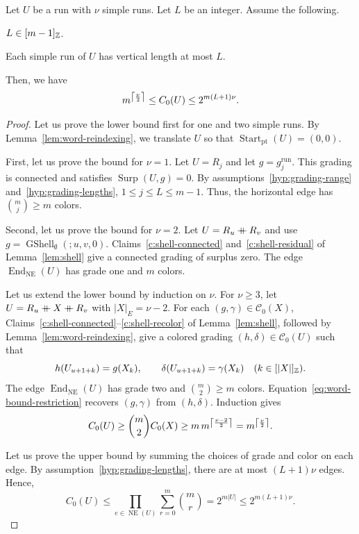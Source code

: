 \begin{lemma}\label{lem:word-bounds}
Let $U$ be a run with $\nu$ simple runs. Let $L$ be an integer.
Assume the following.
\begin{hypotheses}
\item\label{hyp:grading-range} $L\in[m-1]_{\mathbb Z}$.
\item\label{hyp:grading-lengths} Each simple run of $U$ has vertical length at most $L$.
\end{hypotheses}
Then, we have
\[
 m^{\left\lceil\frac{\nu}{2}\right\rceil}\le C_0(U)\le 2^{m(L+1)\nu}.
\]
\end{lemma}
\begin{proof}
Let us prove the lower bound first for one and two simple runs.
By Lemma~\ref{lem:word-reindexing}, we translate $U$ so that $\operatorname{Start}_{\mathrm{pt}}(U)=(0,0)$.

First, let us prove the bound for $\nu=1$.
Let $U=R_j$ and let $g=g_j^{\mathrm{run}}$.
This grading is connected and satisfies $\operatorname{Surp}(U,g)=0$.
By assumptions~\ref{hyp:grading-range} and~\ref{hyp:grading-lengths},
$1\le j\le L\le m-1$. Thus, the horizontal edge has $\binom mj\ge m$ colors.

Second, let us prove the bound for $\nu=2$.
Let $U=R_u\mathbin{+\mkern-10mu+} R_v$ and use
$g=\operatorname{GShell}_{\emptyset}(;u,v,0)$. Claims~\ref{c:shell-connected} and~\ref{c:shell-residual} of Lemma~\ref{lem:shell} give a connected grading of surplus zero.
The edge $\operatorname{End}_{\mathrm{NE}}(U)$ has grade one and $m$ colors.

Let us extend the lower bound by induction on $\nu$.
For $\nu\ge3$, let $U=R_u\mathbin{+\mkern-10mu+} X\mathbin{+\mkern-10mu+} R_v$ with $|X|_E=\nu-2$.
For each $(g,\gamma)\in\mathcal C_0(X)$, Claims~\ref{c:shell-connected}--\ref{c:shell-recolor} of Lemma~\ref{lem:shell}, followed by Lemma~\ref{lem:word-reindexing}, give a colored grading $(h,\delta)\in\mathcal C_0(U)$ such that
\begin{equation}\label{eq:word-bound-restriction}
 h(U_{u+1+k})=g(X_k),\qquad
 \delta(U_{u+1+k})=\gamma(X_k)\quad(k\in[|X|]_{\mathbb Z}).
\end{equation}
The edge $\operatorname{End}_{\mathrm{NE}}(U)$ has grade two and $\binom m2\ge m$ colors.
Equation~\eqref{eq:word-bound-restriction} recovers $(g,\gamma)$ from $(h,\delta)$.
Induction gives
\[
 C_0(U)\ge\binom m2 C_0(X)
 \ge m\,m^{\left\lceil\frac{\nu-2}{2}\right\rceil}=m^{\left\lceil\frac{\nu}{2}\right\rceil}.
\]

Let us prove the upper bound by summing the choices of grade and color on each edge.
By assumption~\ref{hyp:grading-lengths}, there are at most $(L+1)\nu$ edges. Hence,
\[
 C_0(U)\le\prod_{e\in\operatorname{NE}(U)}\sum_{r=0}^m\binom mr
 =2^{m|U|}\le2^{m(L+1)\nu}.
\]
\end{proof}

